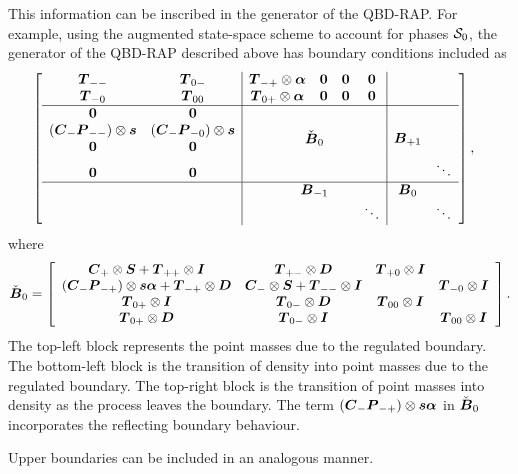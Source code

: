 This information can be inscribed in the generator of the QBD-RAP. For example, using the augmented state-space scheme to account for phases \(\mathcal{S}_0\), the generator of the QBD-RAP described above has boundary conditions included as 
\begin{align*}
&\left[\begin{array}{cc|cccc|cc}
	\bs T_{--} & \bs T_{0-} & \bs T_{-+} \otimes\bs \alpha & \bs 0 & \bs 0 & \bs 0 &&\\
	\bs T_{-0} & \bs T_{00} & \bs T_{0+} \otimes\bs \alpha & \bs 0 & \bs 0 & \bs 0 &&\\\hline
	\bs 0 & \bs 0 &\multicolumn{4}{c|}{\multirow{4}{*}{$\check{\bs B}_{0}$}} & \multirow{4}{*}{$\bs B_{+1}$}& \\
	(\bs C_-\bs P_{--})\otimes \bs s &(\bs C_-\bs P_{-0}) \otimes \bs s& \multicolumn{4}{c|}{} & &\\
	\bs 0 & \bs 0 & \multicolumn{4}{c|}{} &&\\
	\bs 0 & \bs 0 & \multicolumn{4}{c|}{} && \ddots\\ \hline
	& & \multicolumn{4}{c|}{\bs B_{-1}} & \bs B_0 &\\
	& & \multicolumn{3}{c}{}& \ddots &  & \ddots
	\end{array}\right],
\end{align*}
where 
\[\check{\boldsymbol B}_{0} = \left[\begin{array}{cccc}
	 \boldsymbol{C}_+\otimes \boldsymbol{S} + \boldsymbol{T}_{++}\otimes \boldsymbol{I} & \boldsymbol{T}_{+-}\otimes \boldsymbol{D} & \boldsymbol{T}_{+0}\otimes \boldsymbol{I} &  \\
	 (\boldsymbol C_-\boldsymbol P_{-+})\otimes \boldsymbol s \boldsymbol \alpha + \boldsymbol T_{-+}\otimes \boldsymbol D  & \boldsymbol{C}_-\otimes \boldsymbol{S} + \boldsymbol{T}_{--}\otimes \boldsymbol{I} &  & \boldsymbol{T}_{-0}\otimes \boldsymbol{I} \\
	 \boldsymbol{T}_{0+}\otimes \boldsymbol{I} & \boldsymbol{T}_{0-}\otimes \boldsymbol{D} & \boldsymbol{T}_{00}\otimes \boldsymbol{I} &  \\
	 \boldsymbol{T}_{0+}\otimes \boldsymbol{D} & \boldsymbol{T}_{0-}\otimes \boldsymbol{I} &  & \boldsymbol{T}_{00}\otimes \boldsymbol{I} 
	\end{array}\right].\]
The top-left block represents the point masses due to the regulated boundary. The bottom-left block is the transition of density into point masses due to the regulated boundary. The top-right block is the transition of point masses into density as the process leaves the boundary. The term \((\boldsymbol C_-\boldsymbol P_{-+})\otimes \boldsymbol s \boldsymbol \alpha\) in \(\check{\boldsymbol B}_{0}\) incorporates the reflecting boundary behaviour.

Upper boundaries can be included in an analogous manner. 

